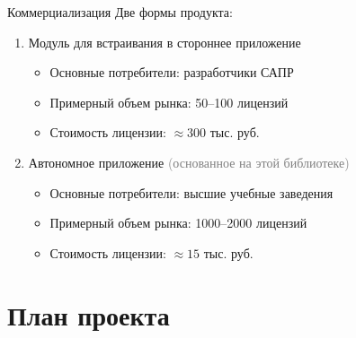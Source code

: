 \documentclass[usenames,dvipsnames,pdftex,unicode,hidelinks]{beamer}
\begin{document}
  \begin{frame}{Коммерциализация}
    Две формы продукта:

    \begin{enumerate}
      \setlength{\itemsep}{5mm}
      \item Модуль для встраивания в стороннее приложение
        \begin{itemize}
          \item Основные потребители: разработчики САПР
          \item Примерный объем рынка: 50--100 лицензий
          \item Стоимость лицензии: $\approx 300$ тыс. руб.
        \end{itemize}
      \item Автономное приложение \textcolor{Gray}{(основанное на этой библиотеке)}
        \begin{itemize}
          \item Основные потребители: высшие учебные заведения
          \item Примерный объем рынка: 1000--2000 лицензий
          \item Стоимость лицензии: $\approx 15$ тыс. руб.
        \end{itemize}
    \end{enumerate}
  \end{frame}

  \section{План проекта}
\end{document}
